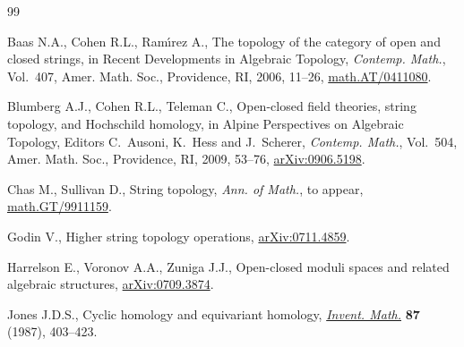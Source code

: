 \begin{thebibliography}{99}

\footnotesize\itemsep=0pt

Baas N.A., Cohen  R.L., Ram\'{\i}rez A.,
The topology of the category of open and closed strings,
in Recent Developments in Algebraic Topology,
{\it Contemp. Math.}, Vol.~407, Amer. Math. Soc., Providence, RI, 2006,  11--26,
\href{http://arxiv.org/abs/math.AT/0411080}{math.AT/0411080}.

Blumberg A.J., Cohen R.L., Teleman C.,
Open-closed f\/ield theories, string topology, and Hochschild homo\-lo\-gy,
in Alpine Perspectives on Algebraic Topology, Editors C.~Ausoni, K.~Hess and J.~Scherer,
{\it Contemp. Math.}, Vol.~504, Amer. Math. Soc., Providence, RI, 2009, 53--76,
\href{http://arxiv.org/abs/0906.5198}{arXiv:0906.5198}.


 Chas M., Sullivan D.,
String topology,
{\it Ann. of Math.}, to appear,
\href{http://arxiv.org/abs/math.GT/9911159}{math.GT/9911159}.

Godin V.,
Higher string topology operations,
\href{http://arxiv.org/abs/0711.4859}{arXiv:0711.4859}.

Harrelson E., Voronov A.A., Zuniga J.J.,
Open-closed moduli spaces and related algebraic structures,
\href{http://arxiv.org/abs/0709.3874}{arXiv:0709.3874}.

Jones J.D.S.,
Cyclic homology and equivariant homology,
\href{http://dx.doi.org/10.1007/BF01389424}{{\it Invent. Math.}} {\bf 87} (1987), 403--423.





\end{thebibliography}
